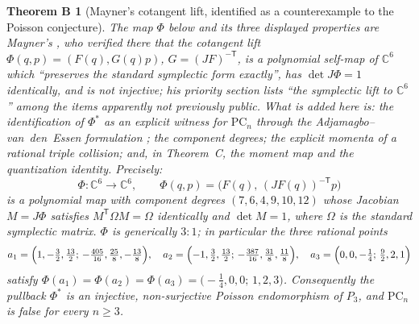 \documentclass[11pt]{amsart}
\newcommand{\CC}{\mathbb{C}}
\newcommand{\PC}{\mathrm{PC}}
\theoremstyle{plain}
\newtheorem*{thmB}{Theorem B}
\theoremstyle{definition}
\theoremstyle{remark}
\begin{document}
\begin{thmB}[Mayner's cotangent lift, identified as a counterexample to
the Poisson conjecture]
\emph{The map $\Phi$ below and its three displayed properties are
Mayner's} \cite[\S8]{Mayner26}, who verified there that the cotangent lift
$\Phi(q,p)=(F(q),G(q)p)$, $G=(JF)^{-\mathsf T}$, is a polynomial self-map
of $\CC^{6}$ which ``preserves the standard symplectic form exactly'', has
$\det J\Phi=1$ identically, and is not injective; his priority section
lists ``the symplectic lift to $\CC^{6}$'' among the items apparently not
previously public. \emph{What is added here} is: the identification of
$\Phi^{*}$ as an explicit witness for $\PC_{n}$ through the
Adjamagbo--van~den~Essen formulation \cite{AvdE07}; the component degrees;
the explicit momenta of a rational triple collision; and, in Theorem~C,
the moment map and the quantization identity. Precisely:
\[
\Phi\colon\CC^{6}\to\CC^{6},\qquad
\Phi(q,p)=\bigl(F(q),\,(JF(q))^{-\mathsf T}p\bigr)
\]
is a polynomial map with component degrees $(7,6,4,9,10,12)$ whose
Jacobian $M=J\Phi$ satisfies $M^{\mathsf T}\Omega M=\Omega$ identically and
$\det M=1$, where $\Omega$ is the standard symplectic matrix. $\Phi$ is
generically $3{:}1$; in particular the three rational points
\[
a_{1}=\Bigl(1,-\tfrac32,\tfrac{13}2;\,-\tfrac{405}{16},\tfrac{25}{8},
-\tfrac{13}{8}\Bigr),\quad
a_{2}=\Bigl(-1,\tfrac32,\tfrac{13}2;\,-\tfrac{387}{16},\tfrac{31}{8},
\tfrac{11}{8}\Bigr),\quad
a_{3}=\Bigl(0,0,-\tfrac14;\,\tfrac92,2,1\Bigr)
\]
satisfy $\Phi(a_{1})=\Phi(a_{2})=\Phi(a_{3})=
\bigl(-\tfrac14,0,0;\,1,2,3\bigr)$. Consequently the pullback $\Phi^{*}$ is
an injective, non-surjective Poisson endomorphism of $P_{3}$, and $\PC_{n}$
is false for every $n\ge3$.
\end{thmB}
\end{document}
